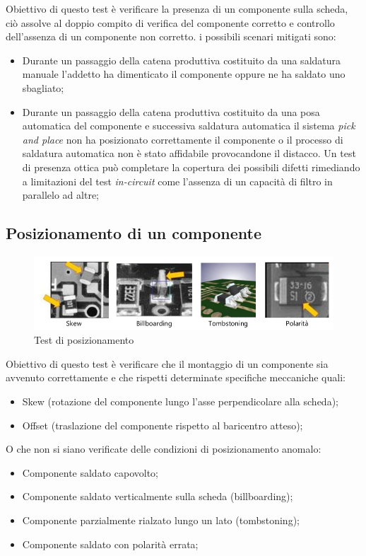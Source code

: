 Obiettivo di questo test è verificare la presenza di un componente sulla scheda, ciò assolve al doppio
compito di verifica del componente corretto e controllo dell'assenza di un componente non corretto. i
possibili scenari mitigati sono:
\begin{itemize}
\item Durante un passaggio della catena produttiva costituito da una saldatura manuale l'addetto ha
dimenticato il componente oppure ne ha saldato uno sbagliato;
\item Durante un passaggio della catena produttiva costituito da una posa automatica del componente
e successiva saldatura automatica il sistema \emph{pick and place} non ha posizionato correttamente il
componente o il processo di saldatura automatica non è stato affidabile provocandone il distacco.
Un test di presenza ottica può completare la copertura dei possibili difetti rimediando a limitazioni del
test \emph{in-circuit} come l'assenza di un capacità di filtro in parallelo ad altre;
\end{itemize}

\subsection{Posizionamento di un componente}

\begin{figure}[!ht]
\centering
\includegraphics[width=.8\textwidth]{img/vari.png}
\caption{Test di posizionamento}
\label{fig:posizionamento}
\end{figure}

Obiettivo di questo test è verificare che il montaggio di un componente sia avvenuto correttamente e che
rispetti determinate specifiche meccaniche quali:
\begin{itemize}
\item Skew (rotazione del componente lungo l'asse perpendicolare alla scheda);
\item Offset (traslazione del componente rispetto al baricentro atteso);
\end{itemize}

O che non si siano verificate delle condizioni di posizionamento anomalo:
\begin{itemize}
\item Componente saldato capovolto;
\item Componente saldato verticalmente sulla scheda (billboarding);
\item Componente parzialmente rialzato lungo un lato (tombstoning);
\item Componente saldato con polarità errata;
\end{itemize}

